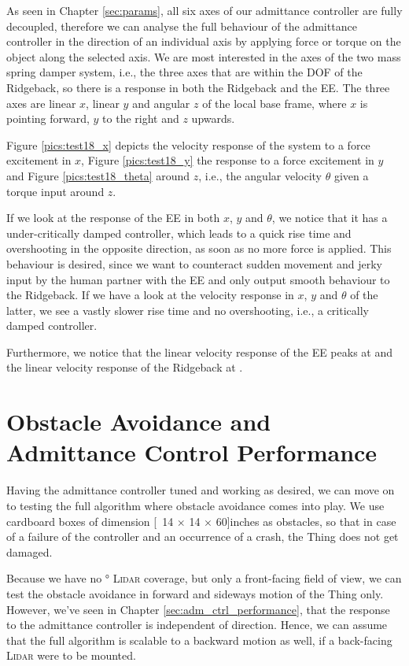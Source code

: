 As seen in Chapter \ref{sec:params}, all six axes of our admittance controller are fully decoupled, therefore we can analyse the full behaviour of the admittance controller in the direction of an individual axis by applying force or torque on the object along the selected axis. We are most interested in the axes of the two mass spring damper system, i.e., the three axes that are within the DOF of the Ridgeback, so there is a response in both the Ridgeback and the EE. The three axes are linear $x$, linear $y$ and angular $z$ of the local base frame, where $x$ is pointing forward, $y$ to the right and $z$ upwards.

Figure \ref{pics:test18_x} depicts the velocity response of the system to a force excitement in $x$, Figure \ref{pics:test18_y} the response to a force excitement in $y$ and Figure \ref{pics:test18_theta} around $z$, i.e., the angular velocity $\theta$ given a torque input around $z$.

If we look at the response of the EE in both $x$, $y$ and $\theta$, we notice that it has a under-critically damped controller, which leads to a quick rise time and overshooting in the opposite direction, as soon as no more force is applied. This behaviour is desired, since we want to counteract sudden movement and jerky input by the human partner with the EE and only output smooth behaviour to the Ridgeback. If we have a look at the velocity response in $x$, $y$ and $\theta$ of the latter, we see a vastly slower rise time and no overshooting, i.e., a critically damped controller.

Furthermore, we notice that the linear velocity response of the EE peaks at  and the linear velocity response of the Ridgeback at .

\section{Obstacle Avoidance and Admittance Control Performance}
Having the admittance controller tuned and working as desired, we can move on to testing the full algorithm where obstacle avoidance comes into play. We use cardboard boxes of dimension \unit[14 $\times$ 14 $\times$ 60]{inches} as obstacles, so that in case of a failure of the controller and an occurrence of a crash, the Thing does not get damaged.

Because we have no \unit[360]{\degree} \textsc{Lidar} coverage, but only a front-facing field of view, we can test the obstacle avoidance in forward and sideways motion of the Thing only. However, we've seen in Chapter \ref{sec:adm_ctrl_performance}, that the response to the admittance controller is independent of direction. Hence, we can assume that the full algorithm is scalable to a backward motion as well, if a back-facing \textsc{Lidar} were to be mounted.

